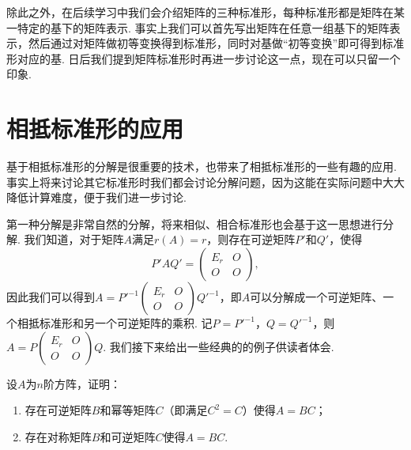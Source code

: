 除此之外，在后续学习中我们会介绍矩阵的三种标准形，每种标准形都是矩阵在某一特定的基下的矩阵表示. 事实上我们可以首先写出矩阵在任意一组基下的矩阵表示，然后通过对矩阵做初等变换得到标准形，同时对基做``初等变换''即可得到标准形对应的基. 日后我们提到矩阵标准形时再进一步讨论这一点，现在可以只留一个印象.

\section{相抵标准形的应用}

基于相抵标准形的分解是很重要的技术，也带来了相抵标准形的一些有趣的应用. 事实上将来讨论其它标准形时我们都会讨论分解问题，因为这能在实际问题中大大降低计算难度，便于我们进一步讨论.

第一种分解是非常自然的分解，将来相似、相合标准形也会基于这一思想进行分解. 我们知道，对于矩阵$A$满足$r(A)=r$，则存在可逆矩阵$P'$和$Q'$，使得
\[P'AQ'=\begin{pmatrix}
        E_r & O \\ O & O
    \end{pmatrix},\]
因此我们可以得到$A=P'^{-1}\begin{pmatrix}
        E_r & O \\ O & O
    \end{pmatrix}Q'^{-1}$，即$A$可以分解成一个可逆矩阵、一个相抵标准形和另一个可逆矩阵的乘积. 记$P=P'^{-1}$，$Q=Q'^{-1}$，则$A=P\begin{pmatrix}
        E_r & O \\ O & O
    \end{pmatrix}Q$. 我们接下来给出一些经典的的例子供读者体会.

\begin{example}{}{}
    设$A$为$n$阶方阵，证明：
    \begin{enumerate}
        \item 存在可逆矩阵$B$和幂等矩阵$C$（即满足$C^2=C$）使得$A=BC$；
        \item 存在对称矩阵$B$和可逆矩阵$C$使得$A=BC$.
    \end{enumerate}
\end{example}

